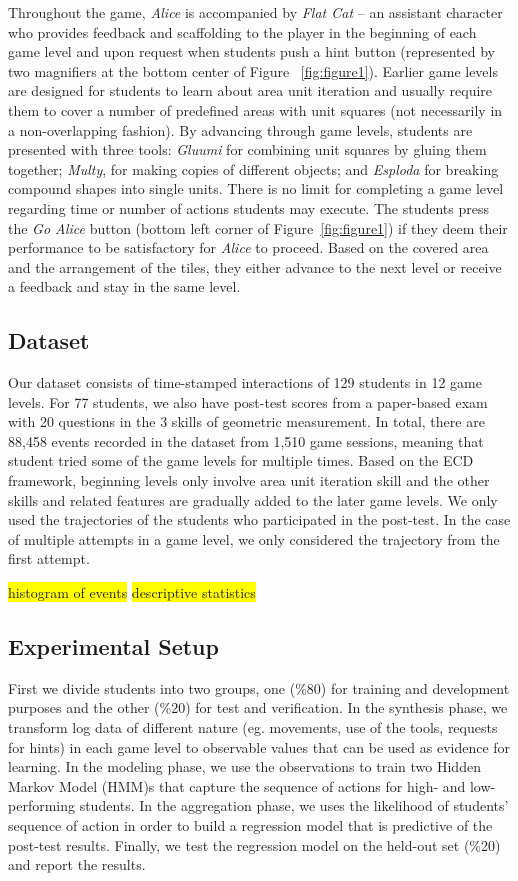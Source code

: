\documentclass{sigchi}
\newcommand{\hl}[1]{\colorbox{yellow}{#1}}
\begin{document}
Throughout the game,  \textit {Alice} is accompanied by \textit {Flat Cat} -- an assistant character who provides feedback and scaffolding to the player in the beginning of each game level and upon request when students push a hint button (represented by two magnifiers at the bottom center of Figure ~\ref{fig:figure1}). Earlier game levels are designed for students to learn about area unit iteration and usually require them to cover a number of predefined areas with unit squares (not necessarily in a non-overlapping fashion). By advancing through game levels, students are presented with three tools: \textit {Gluumi} for combining unit squares by gluing them together; \textit {Multy}, for making copies of different objects; and \textit {Esploda} for breaking compound shapes into single units.  There is no limit for completing a game level regarding time or number of actions students may execute. The students press the \textit {Go Alice} button (bottom left corner of Figure~\ref{fig:figure1}) if they deem their performance to be satisfactory for \textit {Alice} to proceed. Based on the covered area and the arrangement of the tiles, they either advance to the next level or receive a feedback and stay in the same level.

\subsection{Dataset} 
Our dataset consists of time-stamped interactions of 129 students in 12 game levels. 
For 77 students, we also have post-test scores from a paper-based exam with 20 questions in the 3 skills of geometric measurement.
In total, there are 88,458 events recorded in the dataset from 1,510 game sessions, meaning that student tried some of the game levels for multiple times.
Based on the ECD framework, beginning levels only involve area unit iteration skill and the other skills and related features are gradually added to the later game levels.
We only used the trajectories of the students who participated in the post-test.
In the case of multiple attempts in a game level, we only considered the trajectory from the first attempt.

\hl{histogram of events}
\hl{descriptive statistics} 

\subsection{Experimental Setup}
First we divide students into two groups, one (\%80) for training and development purposes and the other (\%20) for test and verification.
In the synthesis phase, we transform log data of different nature (eg. movements, use of the tools, requests for hints) in each game level to observable values that can be used as evidence for learning.
In the modeling phase, we use the observations to train two Hidden Markov Model (HMM)s that capture the sequence of actions for high- and low-performing students.
In the aggregation phase, we uses the likelihood of students' sequence of action in order to build a regression model that is predictive of the post-test results.
Finally, we test the regression model on the held-out set (\%20) and report the results.
\end{document}

